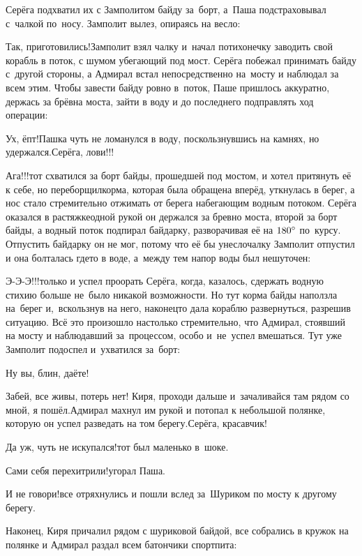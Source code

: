 Серёга подхватил их с Замполитом байду за~борт, а~Паша подстраховывал с~чалкой по~носу. Замполит вылез, опираясь на весло:

\diagdash Так, приготовились!\mdash Замполит взял чалку и~начал потихонечку заводить свой корабль в поток, с шумом убегающий под мост. Серёга побежал принимать байду с~другой стороны, а Адмирал встал непосредственно на~мосту и наблюдал за всем этим. Чтобы завести байду ровно в~поток, Паше пришлось аккуратно, держась за брёвна моста, зайти в воду и до последнего подправлять ход операции:

\diagdash Ух, ёпт!\mdash Пашка чуть не ломанулся в воду, поскользнувшись на камнях, но удержался.\mdash Серёга, лови!!!
 
\diagdash Ага!!!\mdash тот схватился за борт байды, прошедшей под мостом, и хотел притянуть её к себе, но переборщил\mdash корма, которая была обращена вперёд, уткнулась в берег, а нос стало стремительно отжимать от берега набегающим водным потоком. Серёга оказался в растяжке\mdash одной рукой он держался за бревно моста, второй за борт байды, а водный поток подпирал байдарку, разворачивая её на $180\degree$ по~курсу. Отпустить байдарку он не мог, потому что её бы унесло\mdash чалку Замполит отпустил и она болталась где\sdash то в воде, а~между тем напор воды был нешуточен:

\diagdash Э-Э-Э!!!\mdash только и успел проорать Серёга, когда, казалось, сдержать водную стихию больше не~было никакой возможности. Но тут корма байды наползла на~берег и,~вскользнув на него, наконец\sdash то дала кораблю развернуться, разрешив ситуацию. Всё это произошло настолько стремительно, что Адмирал, стоявший на мосту и наблюдавший за~процессом, особо и~не~успел вмешаться. Тут уже Замполит подоспел и~ухватился за~борт:

\diagdash Ну вы, блин, даёте!

\diagdash Забей, все живы, потерь нет! Киря, проходи дальше и~зачаливайся там рядом со мной, я пошёл.\mdash Адмирал махнул им рукой и потопал к небольшой полянке, которую он успел разведать на том берегу.\mdash Серёга, красавчик!

\diagdash Да уж, чуть не искупался!\mdash тот был маленько в~шоке.

\diagdash Сами себя перехитрили!\mdash угорал Паша.

\diagdash И не говори!\mdash все отряхнулись и пошли вслед за~Шуриком по мосту к другому берегу.

Наконец, Киря причалил рядом с шуриковой байдой, все собрались в кружок на полянке и Адмирал раздал всем батончики спортпита:

